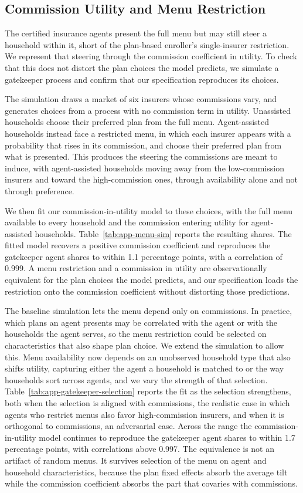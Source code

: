 \documentclass[12pt]{article}
\begin{document}
\subsection{Commission Utility and Menu Restriction}
\label{app:menu-sim}

The certified insurance agents present the full menu but may still steer a household within it, short of the plan-based enroller's single-insurer restriction. We represent that steering through the commission coefficient in utility. To check that this does not distort the plan choices the model predicts, we simulate a gatekeeper process and confirm that our specification reproduces its choices.

The simulation draws a market of six insurers whose commissions vary, and generates choices from a process with no commission term in utility. Unassisted households choose their preferred plan from the full menu. Agent-assisted households instead face a restricted menu, in which each insurer appears with a probability that rises in its commission, and choose their preferred plan from what is presented. This produces the steering the commissions are meant to induce, with agent-assisted households moving away from the low-commission insurers and toward the high-commission ones, through availability alone and not through preference.

We then fit our commission-in-utility model to these choices, with the full menu available to every household and the commission entering utility for agent-assisted households. Table~\ref{tab:app-menu-sim} reports the resulting shares. The fitted model recovers a positive commission coefficient and reproduces the gatekeeper agent shares to within 1.1 percentage points, with a correlation of 0.999. A menu restriction and a commission in utility are observationally equivalent for the plan choices the model predicts, and our specification loads the restriction onto the commission coefficient without distorting those predictions.

The baseline simulation lets the menu depend only on commissions. In practice, which plans an agent presents may be correlated with the agent or with the households the agent serves, so the menu restriction could be selected on characteristics that also shape plan choice. We extend the simulation to allow this. Menu availability now depends on an unobserved household type that also shifts utility, capturing either the agent a household is matched to or the way households sort across agents, and we vary the strength of that selection. Table~\ref{tab:app-gatekeeper-selection} reports the fit as the selection strengthens, both when the selection is aligned with commissions, the realistic case in which agents who restrict menus also favor high-commission insurers, and when it is orthogonal to commissions, an adversarial case. Across the range the commission-in-utility model continues to reproduce the gatekeeper agent shares to within 1.7 percentage points, with correlations above 0.997. The equivalence is not an artifact of random menus. It survives selection of the menu on agent and household characteristics, because the plan fixed effects absorb the average tilt while the commission coefficient absorbs the part that covaries with commissions.
\end{document}
